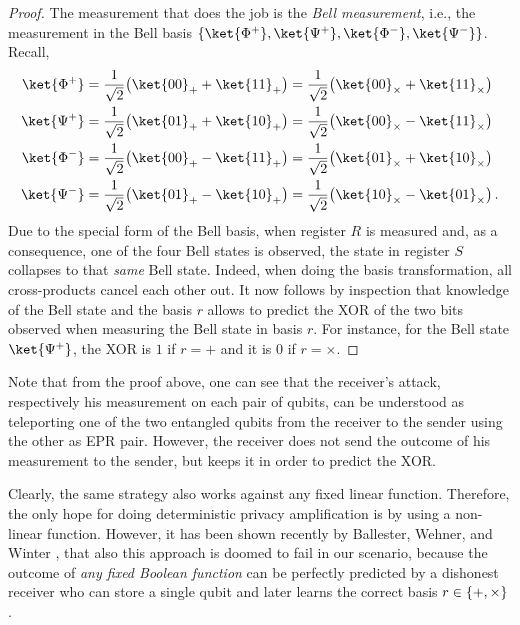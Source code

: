 \begin{proof}
 
The measurement that does the job is the {\em Bell measurement}, i.e., the measurement in the Bell basis $\set{\ket{\Phi^+},\ket{\Psi^+},\ket{\Phi^-},\ket{\Psi^-}}$. Recall, 
\begin{align*}
\ket{\Phi^+} &= \frac{1}{\sqrt{2}} \big(\ket{00}_+ + \ket{11}_+\big) =  \frac{1}{\sqrt{2}} \big(\ket{00}_{\times} + \ket{11}_{\times}\big) \\
\ket{\Psi^+} &= \frac{1}{\sqrt{2}} \big(\ket{01}_+ + \ket{10}_+\big) =  \frac{1}{\sqrt{2}} \big(\ket{00}_{\times} - \ket{11}_{\times}\big) \\
\ket{\Phi^-} &= \frac{1}{\sqrt{2}} \big(\ket{00}_+ - \ket{11}_+\big) =  \frac{1}{\sqrt{2}} \big(\ket{01}_{\times} + \ket{10}_{\times}\big) \\
\ket{\Psi^-} &= \frac{1}{\sqrt{2}} \big(\ket{01}_+ - \ket{10}_+\big) =  \frac{1}{\sqrt{2}} \big(\ket{10}_{\times} - \ket{01}_{\times}\big)  \, .
\end{align*}
Due to the special form of the Bell basis, when register $R$ is
measured and, as a consequence, one of the four Bell states is
observed, the state in register $S$ collapses to that {\em same} Bell
state. Indeed, when doing the basis transformation, all cross-products
cancel each other out. It now follows by inspection that knowledge of
the Bell state and the basis $r$ allows to predict the XOR of the two
bits observed when measuring the Bell state in basis $r$. For
instance, for the Bell state $\ket{\Psi^+}$, the XOR is $1$ if $r = +$
and it is $0$ if $r = \times$.
\end{proof}

Note that from the proof above, one can see that the receiver's attack,
respectively his measurement on each pair of qubits, can be understood
as teleporting one of the two entangled qubits from the receiver to
the sender using the other as EPR pair. However, the receiver does not send
the outcome of his measurement to the sender, but keeps it in order to
predict the XOR. 

Clearly, the same strategy also works against any fixed linear
function. Therefore, the only hope for doing deterministic privacy
amplification is by using a non-linear function. However, it has been
shown recently by Ballester, Wehner, and Winter \cite{BWW06}, that
also this approach is doomed to fail in our scenario, because the
outcome of \emph{any fixed Boolean function} can be perfectly predicted by a
dishonest receiver who can store a single qubit and later learns the
correct basis $r \in \{+,\times\}$. 

